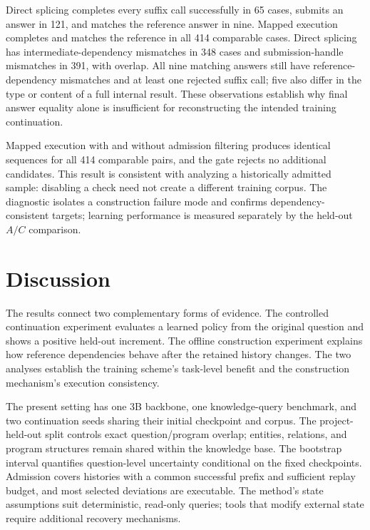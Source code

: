 \documentclass[runningheads]{llncs}
\begin{document}
Direct splicing completes every suffix call successfully in 65 cases, submits an answer in 121, and matches the reference answer in nine. Mapped execution completes and matches the reference in all 414 comparable cases. Direct splicing has intermediate-dependency mismatches in 348 cases and submission-handle mismatches in 391, with overlap. All nine matching answers still have reference-dependency mismatches and at least one rejected suffix call; five also differ in the type or content of a full internal result. These observations establish why final answer equality alone is insufficient for reconstructing the intended training continuation.

Mapped execution with and without admission filtering produces identical sequences for all 414 comparable pairs, and the gate rejects no additional candidates. This result is consistent with analyzing a historically admitted sample: disabling a check need not create a different training corpus. The diagnostic isolates a construction failure mode and confirms dependency-consistent targets; learning performance is measured separately by the held-out $A/C$ comparison.

\section{Discussion}

The results connect two complementary forms of evidence. The controlled continuation experiment evaluates a learned policy from the original question and shows a positive held-out increment. The offline construction experiment explains how reference dependencies behave after the retained history changes. The two analyses establish the training scheme's task-level benefit and the construction mechanism's execution consistency.

The present setting has one 3B backbone, one knowledge-query benchmark, and two continuation seeds sharing their initial checkpoint and corpus. The project-held-out split controls exact question/program overlap; entities, relations, and program structures remain shared within the knowledge base. The bootstrap interval quantifies question-level uncertainty conditional on the fixed checkpoints. Admission covers histories with a common successful prefix and sufficient replay budget, and most selected deviations are executable. The method's state assumptions suit deterministic, read-only queries; tools that modify external state require additional recovery mechanisms.
\end{document}
